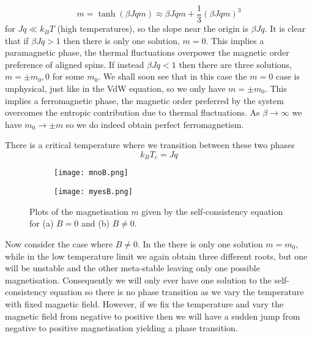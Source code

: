 \documentclass[a4paper,11pt,oneside]{book}
\begin{document}
\begin{equation}
    m = \tanh(\beta J qm) \approx \beta J qm +\frac{1}{3}(\beta J qm)^3
\end{equation}
for $Jq\ll k_B T$ (high temperatures), so the slope near the origin is $\beta J q$. It is clear that if $\beta J q>1$ then there is only one solution, $m=0$. This implies a paramagnetic phase, the thermal fluctuations overpower the magnetic order preference of aligned spins. If instead $\beta Jq<1$ then there are three solutions, $m=\pm m_0,0$ for some $m_0$. We shall soon see that in this case the $m=0$ case is unphysical, just like in the VdW equation, so we only have $m=\pm m_0$. This implies a ferromagnetic phase, the magnetic order preferred by the system overcomes the entropic contribution due to thermal fluctuations. As $\beta \rightarrow \infty$ we have $m_0 \rightarrow \pm m$ so we do indeed obtain perfect ferromagnetism. 


There is a critical temperature where we transition between these two phases
\begin{equation}
    k_BT_c = Jq
\end{equation}
\begin{figure}[h!]
\centering
\begin{subfigure}{0.35\textwidth}
  \centering
  \texttt{[image: mnoB.png]}
  \label{Beq0 phase}
  \caption{}
\end{subfigure}%
\begin{subfigure}{0.35\textwidth}
  \centering
  \texttt{[image: myesB.png]}
  \label{Bnot0 phase}
  \caption{}
\end{subfigure}
\caption{Plots of the magnetisation $m$ given by the self-consistency equation for (a) $B =0$ and (b) $B \neq 0$.}
\label{fig:test}
\end{figure}
Now consider the case where $B \neq 0$. In the  there is only one solution $m=m_0$, while in the low temperature limit we again obtain three different roots, but one will be unstable and the other meta-stable leaving only one possible magnetisation. Consequently we will only ever have one solution to the self-consistency equation so there is no phase transition as we vary the temperature with fixed magnetic field. However, if we fix the temperature and vary the magnetic field from negative to positive then we will have a sudden jump from negative to positive magnetisation yielding a phase transition.
\end{document}
